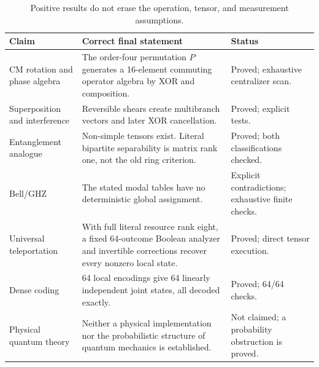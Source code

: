 \documentclass[11pt,a4paper]{article}
\theoremstyle{definition}\newtheorem{definition}[theorem]{Definition}
\begin{document}
\begin{table}[htbp]
\centering\small
\begin{tabularx}{\textwidth}{@{}L{34mm}Y L{40mm}@{}}
\toprule
Claim & Correct final statement & Status\\\midrule
CM rotation and phase algebra & The order-four permutation $P$ generates a 16-element commuting operator algebra by XOR and composition. & Proved; exhaustive centralizer scan.\\
Superposition and interference & Reversible shears create multibranch vectors and later XOR cancellation. & Proved; explicit tests.\\
Entanglement analogue & Non-simple tensors exist. Literal bipartite separability is matrix rank one, not the old ring criterion. & Proved; both classifications checked.\\
Bell/GHZ & The stated modal tables have no deterministic global assignment. & Explicit contradictions; exhaustive finite checks.\\
Universal teleportation & With full literal resource rank eight, a fixed 64-outcome Boolean analyzer and invertible corrections recover every nonzero local state. & Proved; direct tensor execution.\\
Dense coding & 64 local encodings give 64 linearly independent joint states, all decoded exactly. & Proved; 64/64 checks.\\
Physical quantum theory & Neither a physical implementation nor the probabilistic structure of quantum mechanics is established. & Not claimed; a probability obstruction is proved.\\
\bottomrule
\end{tabularx}
\caption{Positive results do not erase the operation, tensor, and measurement assumptions.}
\end{table}
\end{document}
